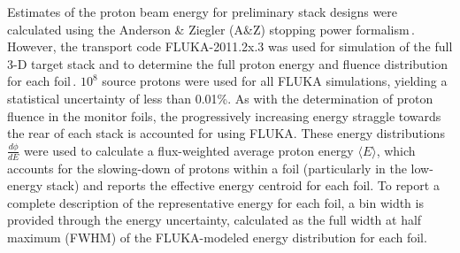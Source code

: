 Estimates of the proton beam energy for preliminary stack designs were calculated using the Anderson \& Ziegler (A\&Z) stopping power formalism\,\cite{Andersen_Ziegler_1977,Ziegler1985,Ziegler1999}.
However, the 
transport code FLUKA-2011.2x.3 was used for simulation of the full 3-D target stack and to determine the full proton energy and fluence distribution for each foil\,\cite{Bohlen2014a}. 
$10^8$ source protons were used for all FLUKA simulations, 
yielding a statistical uncertainty 
of less than 0.01\%.
As with the determination of proton fluence in the monitor foils, the progressively increasing energy straggle towards the rear of each stack is accounted for using 
FLUKA.
These energy distributions $\frac{d\phi}{dE}$ were used to calculate a flux-weighted average proton  energy $\langle E \rangle$, which accounts for the slowing-down of protons within a foil (particularly in the low-energy stack) and reports the effective  energy centroid for each foil.
To report a complete description of the representative energy for each foil, a bin width is provided through the  energy uncertainty, calculated as the full width at half maximum (FWHM) of the FLUKA-modeled energy distribution for each foil.

